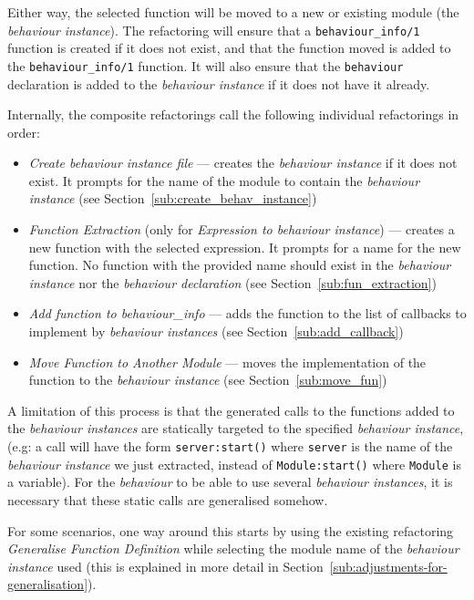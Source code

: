 Either way, the selected function will be moved to a new or existing
module (the \emph{behaviour instance}). The refactoring will ensure
that a \texttt{behaviour\_info/1} function is created if it does not
exist, and that the function moved is added to the \texttt{behaviour\_info/1}
function. It will also ensure that the \texttt{behaviour} declaration
is added to the \emph{behaviour instance} if it does not have it already. 

Internally, the composite refactorings call the following individual
refactorings in order:
\begin{itemize}
\item \emph{Create behaviour instance file} --- creates the \emph{behaviour
instance} if it does not exist. It prompts for the name of the module
to contain the \emph{behaviour instance} (see Section~\ref{sub:create_behav_instance})
\item \emph{Function Extraction} (only for \emph{Expression to behaviour
instance}) --- creates a new function with the selected expression.
It prompts for a name for the new function. No function with the provided
name should exist in the \emph{behaviour instance} nor the \emph{behaviour
declaration} (see Section~\ref{sub:fun_extraction})
\item \emph{Add function to behaviour\_info} --- adds the function to the
list of callbacks to implement by \emph{behaviour instances} (see
Section~\ref{sub:add_callback})
\item \emph{Move Function to Another Module} --- moves the implementation
of the function to the \emph{behaviour instance} (see Section~\ref{sub:move_fun})
\end{itemize}
A limitation of this process is that the generated calls to the functions
added to the \emph{behaviour instances} are statically targeted to
the specified \emph{behaviour instance}, (e.g: a call will have the
form \texttt{server:start()} where \texttt{server} is the name of
the \emph{behaviour instance} we just extracted, instead of \texttt{Module:start()}
where \texttt{Module} is a variable). For the \emph{behaviour} to
be able to use several \emph{behaviour instances}, it is necessary
that these static calls are generalised somehow.

For some scenarios, one way around this starts by using the existing
refactoring \emph{Generalise Function Definition} while selecting
the module name of the \emph{behaviour instance} used (this is explained
in more detail in Section~\ref{sub:adjustments-for-generalisation}).

